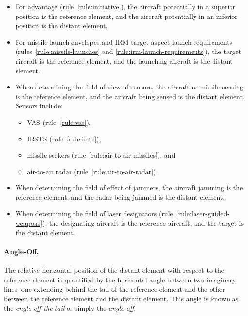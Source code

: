 {\begin{itemize}
\item For advantage (rule~\ref{rule:initiative}), the aircraft potentially in a superior position is the reference element, and the aircraft potentially in an inferior position is the distant element.

\item For missile launch envelopes and IRM target aspect launch requirements (rules~\ref{rule:missile-launches} and \ref{rule:irm-launch-requirements}), the target aircraft is the reference element, and the launching aircraft is the distant element.

\item When determining the field of view of sensors, the aircraft or missile sensing is the reference element, and the aircraft being sensed is the distant element. Sensors include:
\begin{itemize} 
\item VAS (rule~\ref{rule:vas}),
\item IRSTS (rule~\ref{rule:irsts}),
\item missile seekers (rule~\ref{rule:air-to-air-missiles}), and
\item air-to-air radar (rule~\ref{rule:air-to-air-radar}).
\end{itemize}


\item When determining the field of effect of jammers, the aircraft jamming is the reference element, and the radar being jammed is the distant element.

\item When determining the field of laser designators (rule~\ref{rule:laser-guided-weapons}), the designating aircraft is the reference aircraft, and the target is the distant element.

\end{itemize}





\paragraph{Angle-Off.} 

The relative horizontal position of the distant element with respect to the reference element is quantified by the horizontal angle between two imaginary lines, one extending behind the tail of the reference element and the other between the reference element and the distant element. This angle is known as the \emph{angle off the tail} or simply the \emph{angle-off}. 

}
